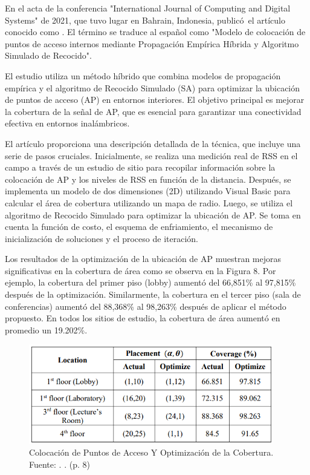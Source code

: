 \clearpage
En el acta de la conferencia "International Journal of Computing and Digital Systems" de 2021, que tuvo lugar en Bahrain, Indonesia, \cite{pr_mukti2021placemodelindo} publicó el artículo conocido como . El término se traduce al español como "Modelo de colocación de puntos de acceso internos mediante Propagación Empírica Híbrida y Algoritmo Simulado de Recocido".

El estudio utiliza un método híbrido que combina modelos de propagación empírica y el algoritmo de Recocido Simulado (SA) para optimizar la ubicación de puntos de acceso (AP) en entornos interiores. El objetivo principal es mejorar la cobertura de la señal de AP, que es esencial para garantizar una conectividad efectiva en entornos inalámbricos.

El artículo proporciona una descripción detallada de la técnica, que incluye una serie de pasos cruciales. Inicialmente, se realiza una medición real de RSS en el campo a través de un estudio de sitio para recopilar información sobre la colocación de AP y los niveles de RSS en función de la distancia. Después, se implementa un modelo de dos dimensiones (2D) utilizando Visual Basic para calcular el área de cobertura utilizando un mapa de radio. Luego, se utiliza el algoritmo de Recocido Simulado para optimizar la ubicación de AP. Se toma en cuenta la función de costo, el esquema de enfriamiento, el mecanismo de inicialización de soluciones y el proceso de iteración.

Los resultados de la optimización de la ubicación de AP muestran mejoras significativas en la cobertura de área como se observa en la Figura 8. Por ejemplo, la cobertura del primer piso (lobby) aumentó del 66,851\% al 97,815\% después de la optimización. Similarmente, la cobertura en el tercer piso (sala de conferencias) aumentó del 88,368\% al 98,263\% después de aplicar el método propuesto. En todos los sitios de estudio, la cobertura de área aumentó en promedio un 19.202\%.

\begin{figure}[!ht]
	\begin{center}
		\includegraphics[width=0.95\textwidth]{2/figures/mukti2021.png}
		\caption[Colocación de Puntos de Acceso Y Optimización de la Cobertura]{Colocación de Puntos de Acceso Y Optimización de la Cobertura.\\
			Fuente: \cite{pr_mukti2021placemodelindo}. . (p. 8)}
		\label{2:fig116}
	\end{center}
\end{figure}

